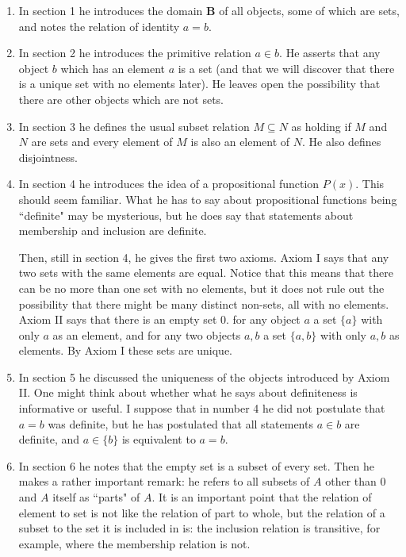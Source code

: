 \documentclass[12pt]{article}
\begin{document}
\begin{enumerate}

\item In section 1 he introduces the domain {\bf B} of all objects, some of which are sets, and notes the relation of identity $a=b$.

\item In section 2 he introduces the primitive relation $a \in b$.  He asserts that any object $b$ which has an element $a$ is a set (and that we will discover that there is a unique set with no elements later).  He leaves open the possibility that there are other objects which are not sets.

\item In section 3 he defines the usual subset relation $M \subseteq N$ as holding if $M$ and $N$ are sets and every element of $M$ is also an element of $N$.  He also defines disjointness.

\item In section 4 he introduces the idea of a propositional function $P(x)$.  This should seem familiar.  What he has to say about propositional functions being ``definite" may be mysterious, but he does say that statements about membership and inclusion are definite.

Then, still in section 4, he gives the first two axioms.  Axiom I says that any two sets with the same elements are equal.  Notice that this means that there can be no more
than one set with no elements, but it does not rule out the possibility that there might be many distinct non-sets, all with no elements.  Axiom II says that there is an empty set 0.
for any object $a$ a set $\{a\}$ with only $a$ as an element, and for any two objects $a,b$ a set $\{a,b\}$ with only $a,b$ as elements.  By Axiom I these sets are unique.

\item In section 5 he discussed the uniqueness of the objects introduced by Axiom II.  One might think about whether what he says about definiteness is informative or useful.
I suppose that in number 4 he did not postulate that $a=b$ was definite, but he has postulated that all statements $a \in b$ are definite, and $a \in \{b\}$ is equivalent to $a=b$.

\item In section 6 he notes that the empty set is a subset of every set.  Then he makes a rather important remark:  he refers to all subsets of $A$ other than 0 and $A$ itself as
``parts" of $A$.  It is an important point that the relation of element to set is not like the relation of part to whole, but the relation of a subset to the set it is included in is:  the inclusion relation is transitive, for example, where the membership relation is not.


\end{enumerate}
\end{document}
